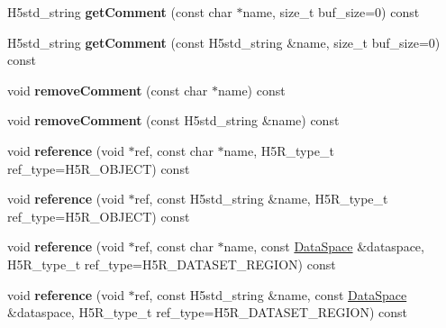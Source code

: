 \begin{DoxyCompactItemize}
\mbox{\label{class_h5_1_1_h5_location_a60519208cec35cb3b5714c4ab4c42b78}} 
H5std\+\_\+string {\bfseries get\+Comment} (const char $\ast$name, size\+\_\+t buf\+\_\+size=0) const
\item 
\mbox{\label{class_h5_1_1_h5_location_a19123efc0dbd20e1ffa7eeaef4dba284}} 
H5std\+\_\+string {\bfseries get\+Comment} (const H5std\+\_\+string \&name, size\+\_\+t buf\+\_\+size=0) const
\item 
\mbox{\label{class_h5_1_1_h5_location_a196e3fe0976e1d5485be73a1134cec0a}} 
void {\bfseries remove\+Comment} (const char $\ast$name) const
\item 
\mbox{\label{class_h5_1_1_h5_location_a2b7b66cc4365acbd187c6e198ab8d6fe}} 
void {\bfseries remove\+Comment} (const H5std\+\_\+string \&name) const
\item 
\mbox{\label{class_h5_1_1_h5_location_ad5fbc78ec9b124db4f062656aa5b2629}} 
void {\bfseries reference} (void $\ast$ref, const char $\ast$name, H5\+R\+\_\+type\+\_\+t ref\+\_\+type=H5\+R\+\_\+\+O\+B\+J\+E\+CT) const
\item 
\mbox{\label{class_h5_1_1_h5_location_a20fadd564b45f02c965f01b767647e32}} 
void {\bfseries reference} (void $\ast$ref, const H5std\+\_\+string \&name, H5\+R\+\_\+type\+\_\+t ref\+\_\+type=H5\+R\+\_\+\+O\+B\+J\+E\+CT) const
\item 
\mbox{\label{class_h5_1_1_h5_location_a1df65b439283aa921b774e588beec215}} 
void {\bfseries reference} (void $\ast$ref, const char $\ast$name, const \hyperlink{class_h5_1_1_data_space}{Data\+Space} \&dataspace, H5\+R\+\_\+type\+\_\+t ref\+\_\+type=H5\+R\+\_\+\+D\+A\+T\+A\+S\+E\+T\+\_\+\+R\+E\+G\+I\+ON) const
\item 
\mbox{\label{class_h5_1_1_h5_location_a6c6b3923a983d32e106f0d3200b07d3e}} 
void {\bfseries reference} (void $\ast$ref, const H5std\+\_\+string \&name, const \hyperlink{class_h5_1_1_data_space}{Data\+Space} \&dataspace, H5\+R\+\_\+type\+\_\+t ref\+\_\+type=H5\+R\+\_\+\+D\+A\+T\+A\+S\+E\+T\+\_\+\+R\+E\+G\+I\+ON) const

\end{DoxyCompactItemize}
